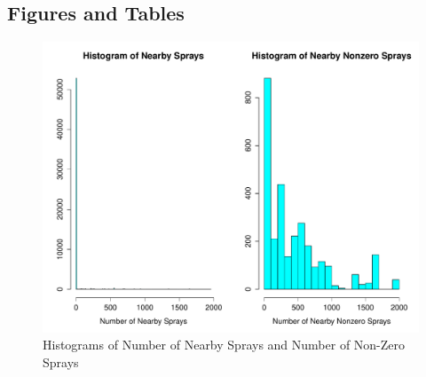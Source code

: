 \documentclass[12pt]{article}
\begin{document}
\subsection{Figures and Tables}
\begin{figure}[H] \center
\includegraphics[scale=.60]{Hist_NearbySprays.pdf}
\caption*{Histograms of Number of Nearby Sprays and Number of Non-Zero Sprays}
\end{figure}
\end{document}
